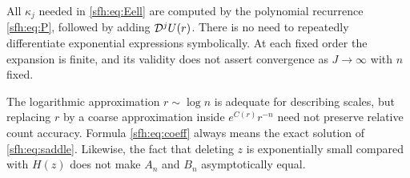 All $\kappa_j$ needed in \eqref{sfh:eq:Eell} are computed by the polynomial recurrence \eqref{sfh:eq:P}, followed by adding $\mathcal D^jU(r)$. There is no need to repeatedly differentiate exponential expressions symbolically. At each fixed order the expansion is finite, and its validity does not assert convergence as $J\to\infty$ with $n$ fixed.

\begin{remark}
The logarithmic approximation $r\sim\log n$ is adequate for describing scales, but replacing $r$ by a coarse approximation inside $e^{C(r)}r^{-n}$ need not preserve relative count accuracy. Formula \eqref{sfh:eq:coeff} always means the exact solution of \eqref{sfh:eq:saddle}. Likewise, the fact that deleting $z$ is exponentially small compared with $H(z)$ does not make $A_n$ and $B_n$ asymptotically equal.
\end{remark}
